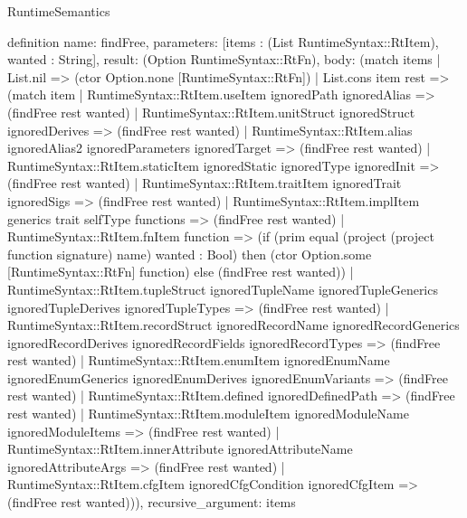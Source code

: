 \begin{lexlean}{RuntimeSemantics}
\begin{semanticmodule}
definition{
  name: findFree,
  parameters: [items : (List RuntimeSyntax::RtItem), wanted : String],
  result: (Option RuntimeSyntax::RtFn),
  body: (match items
    | List.nil => (ctor Option.none [RuntimeSyntax::RtFn])
    | List.cons item rest => (match item
      | RuntimeSyntax::RtItem.useItem ignoredPath ignoredAlias => (findFree rest wanted)
      | RuntimeSyntax::RtItem.unitStruct ignoredStruct ignoredDerives => (findFree rest wanted)
      | RuntimeSyntax::RtItem.alias ignoredAlias2 ignoredParameters ignoredTarget => (findFree rest wanted)
      | RuntimeSyntax::RtItem.staticItem ignoredStatic ignoredType ignoredInit => (findFree rest wanted)
      | RuntimeSyntax::RtItem.traitItem ignoredTrait ignoredSigs => (findFree rest wanted)
      | RuntimeSyntax::RtItem.implItem generics trait selfType functions => (findFree rest wanted)
      | RuntimeSyntax::RtItem.fnItem function => (if (prim equal (project (project function signature) name) wanted : Bool) then (ctor Option.some [RuntimeSyntax::RtFn] function) else (findFree rest wanted))
      | RuntimeSyntax::RtItem.tupleStruct ignoredTupleName ignoredTupleGenerics ignoredTupleDerives ignoredTupleTypes => (findFree rest wanted)
      | RuntimeSyntax::RtItem.recordStruct ignoredRecordName ignoredRecordGenerics ignoredRecordDerives ignoredRecordFields ignoredRecordTypes => (findFree rest wanted)
      | RuntimeSyntax::RtItem.enumItem ignoredEnumName ignoredEnumGenerics ignoredEnumDerives ignoredEnumVariants => (findFree rest wanted)
      | RuntimeSyntax::RtItem.defined ignoredDefinedPath => (findFree rest wanted)
      | RuntimeSyntax::RtItem.moduleItem ignoredModuleName ignoredModuleItems => (findFree rest wanted)
      | RuntimeSyntax::RtItem.innerAttribute ignoredAttributeName ignoredAttributeArgs => (findFree rest wanted)
      | RuntimeSyntax::RtItem.cfgItem ignoredCfgCondition ignoredCfgItem => (findFree rest wanted))),
  recursive_argument: items
}


\end{semanticmodule}
\end{lexlean}
